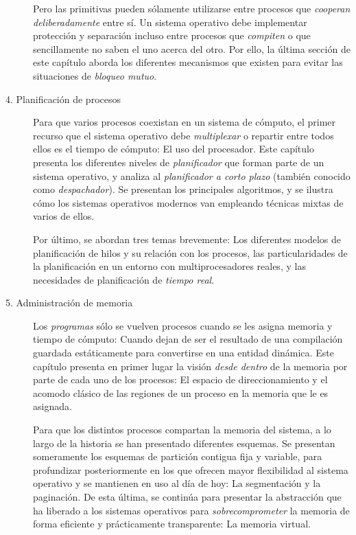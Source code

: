 \documentclass[11pt,fleqn]{book} %
\begin{document}
\begin{description}
     Pero las primitivas pueden sólamente utilizarse entre procesos
     que \emph{cooperan deliberadamente} entre sí. Un sistema operativo
     debe implementar protección y separación incluso entre procesos
     que \emph{compiten} o que sencillamente no saben el uno acerca del
     otro. Por ello, la última sección de este capítulo aborda los
     diferentes mecanismos que existen para evitar las situaciones de
     \emph{bloqueo mutuo}.
\item[4. Planificación de procesos] Para que varios procesos coexistan
     en un sistema de cómputo, el primer recurso que el sistema
     operativo debe \emph{multiplexar} o repartir entre todos ellos es el tiempo de
     cómputo: El uso del procesador. Este capítulo presenta los
     diferentes niveles de \emph{planificador} que forman parte de un
     sistema operativo, y analiza al \emph{planificador a corto plazo}
     (también conocido como \emph{despachador}). Se presentan los
     principales algoritmos, y se ilustra cómo los sistemas operativos
     modernos van empleando técnicas mixtas de varios de ellos.

     Por último, se abordan tres temas brevemente: Los diferentes
     modelos de planificación de hilos y su relación
     con los procesos, las particularidades de la planificación en un
     entorno con multiprocesadores reales, y las necesidades de
     planificación de \emph{tiempo real}.
\item[5. Administración de memoria] Los \emph{programas} sólo se vuelven
     procesos cuando se les asigna memoria y tiempo de cómputo: Cuando dejan de ser el
     resultado de una compilación guardada estáticamente para
     convertirse en una entidad dinámica. Este capítulo presenta en
     primer lugar la visión \emph{desde dentro} de la memoria por parte de
     cada uno de los procesos: El espacio de direccionamiento y el
     acomodo clásico de las regiones de un proceso en la memoria que
     le es asignada.

     Para que los distintos procesos compartan la memoria del sistema,
     a lo largo de la historia se han presentado diferentes
     esquemas. Se presentan someramente los esquemas de partición
     contigua fija y variable, para profundizar posteriormente en los
     que ofrecen mayor flexibilidad al sistema operativo y se
     mantienen en uso al día de hoy: La segmentación y la
     paginación. De esta última, se continúa para presentar la
     abstracción que ha liberado a los sistemas operativos para
     \emph{sobrecomprometer} la memoria de forma eficiente y prácticamente
     transparente: La memoria virtual.


\end{description}
\end{document}
